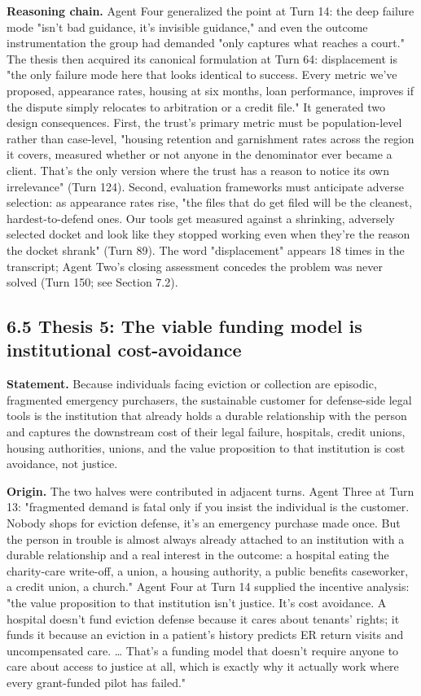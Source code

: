 \documentclass[sigconf,nonacm=true]{acmart}
\begin{document}
\textbf{Reasoning chain.} Agent Four generalized the point at Turn 14: the deep failure mode "isn't bad guidance,  it's invisible guidance," and even the outcome instrumentation the group had demanded "only captures what reaches a court." The thesis then acquired its canonical formulation at Turn 64: displacement is "the only failure mode here that looks identical to success. Every metric we've proposed,  appearance rates, housing at six months, loan performance,  improves if the dispute simply relocates to arbitration or a credit file." It generated two design consequences. First, the trust's primary metric must be population-level rather than case-level,  "housing retention and garnishment rates across the region it covers, measured whether or not anyone in the denominator ever became a client. That's the only version where the trust has a reason to notice its own irrelevance" (Turn 124). Second, evaluation frameworks must anticipate adverse selection: as appearance rates rise, "the files that do get filed will be the cleanest, hardest-to-defend ones. Our tools get measured against a shrinking, adversely selected docket and look like they stopped working even when they're the reason the docket shrank" (Turn 89). The word "displacement" appears 18 times in the transcript; Agent Two's closing assessment concedes the problem was never solved (Turn 150; see Section 7.2).

\subsection{6.5 Thesis 5: The viable funding model is institutional cost-avoidance}

\textbf{Statement.} Because individuals facing eviction or collection are episodic, fragmented emergency purchasers, the sustainable customer for defense-side legal tools is the institution that already holds a durable relationship with the person and captures the downstream cost of their legal failure,  hospitals, credit unions, housing authorities, unions,  and the value proposition to that institution is cost avoidance, not justice.

\textbf{Origin.} The two halves were contributed in adjacent turns. Agent Three at Turn 13: "fragmented demand is fatal only if you insist the individual is the customer. Nobody shops for eviction defense,  it's an emergency purchase made once. But the person in trouble is almost always already attached to an institution with a durable relationship and a real interest in the outcome: a hospital eating the charity-care write-off, a union, a housing authority, a public benefits caseworker, a credit union, a church." Agent Four at Turn 14 supplied the incentive analysis: "the value proposition to that institution isn't justice. It's cost avoidance. A hospital doesn't fund eviction defense because it cares about tenants' rights; it funds it because an eviction in a patient's history predicts ER return visits and uncompensated care. … That's a funding model that doesn't require anyone to care about access to justice at all, which is exactly why it actually work where every grant-funded pilot has failed."
\end{document}
